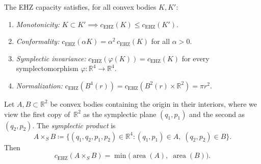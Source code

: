 \begin{lemma}\label{lem:capacity-axioms}
The EHZ capacity satisfies, for all convex bodies $K, K'$:
\begin{enumerate}
\item \emph{Monotonicity:} $K \subset K' \implies c_{\mathrm{EHZ}}(K) \leq c_{\mathrm{EHZ}}(K')$.
\item \emph{Conformality:} $c_{\mathrm{EHZ}}(\alpha K) = \alpha^2\, c_{\mathrm{EHZ}}(K)$
  for all $\alpha > 0$.
\item \emph{Symplectic invariance:}
  $c_{\mathrm{EHZ}}(\varphi(K)) = c_{\mathrm{EHZ}}(K)$
  for every symplectomorphism $\varphi \colon \mathbb{R}^4 \to \mathbb{R}^4$.
\item \emph{Normalization:}
  $c_{\mathrm{EHZ}}(B^4(r)) = c_{\mathrm{EHZ}}(B^2(r) \times \mathbb{R}^2) = \pi r^2$.
\end{enumerate}
\end{lemma}


\begin{proposition}%
\label{prop:capacity-symplectic-product}
Let $A, B \subset \mathbb{R}^2$ be convex bodies containing
the origin in their interiors, where we view the first copy
of~$\mathbb{R}^2$ as the symplectic plane $(q_1, p_1)$ and
the second as $(q_2, p_2)$.
The \emph{symplectic product} is
\[
  A \times_S B
    \coloneqq \{(q_1, q_2, p_1, p_2) \in \mathbb{R}^4
      : (q_1, p_1) \in A,\; (q_2, p_2) \in B\}.
\]
Then
\[
  c_{\mathrm{EHZ}}(A \times_S B)
    = \min\!\bigl(\operatorname{area}(A),\;
                   \operatorname{area}(B)\bigr).
\]
\end{proposition}

